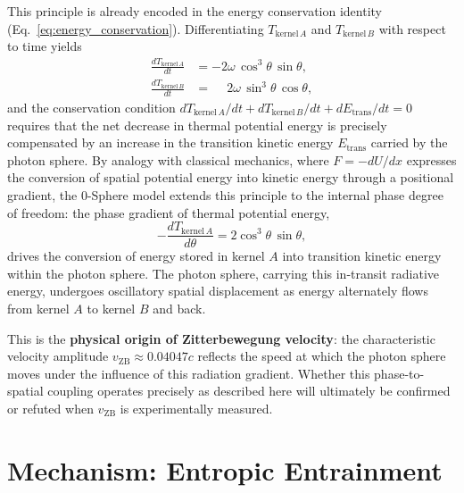 \documentclass[12pt,letterpaper]{article}
\begin{document}
This principle is already encoded in the energy conservation identity (Eq.~\ref{eq:energy_conservation}). Differentiating $T_{\mathrm{kernel}\,A}$ and $T_{\mathrm{kernel}\,B}$ with respect to time yields
\begin{align*}
  \frac{dT_{\mathrm{kernel}\,A}}{dt} &= -2\omega\,\cos^3\!\theta\,\sin\theta, \\
  \frac{dT_{\mathrm{kernel}\,B}}{dt} &= \phantom{-}2\omega\,\sin^3\!\theta\,\cos\theta,
\end{align*}
and the conservation condition $dT_{\mathrm{kernel}\,A}/dt + dT_{\mathrm{kernel}\,B}/dt + dE_{\mathrm{trans}}/dt = 0$ requires that the net decrease in thermal potential energy is precisely compensated by an increase in the transition kinetic energy $E_{\mathrm{trans}}$ carried by the photon sphere. By analogy with classical mechanics, where $F = -dU/dx$ expresses the conversion of spatial potential energy into kinetic energy through a positional gradient, the 0-Sphere model extends this principle to the internal phase degree of freedom: the phase gradient of thermal potential energy,
\[
  -\frac{dT_{\mathrm{kernel}\,A}}{d\theta} = 2\cos^3\!\theta\,\sin\theta,
\]
drives the conversion of energy stored in kernel $A$ into transition kinetic energy within the photon sphere. The photon sphere, carrying this in-transit radiative energy, undergoes oscillatory spatial displacement as energy alternately flows from kernel $A$ to kernel $B$ and back.

This is the \textbf{physical origin of Zitterbewegung velocity}: the characteristic velocity amplitude $v_{\mathrm{ZB}} \approx 0.04047c$ reflects the speed at which the photon sphere moves under the influence of this radiation gradient. Whether this phase-to-spatial coupling operates precisely as described here will ultimately be confirmed or refuted when $v_{\mathrm{ZB}}$ is experimentally measured.


\section{Mechanism: Entropic Entrainment}
\label{sec:mechanism}

\justifying

\end{document}
